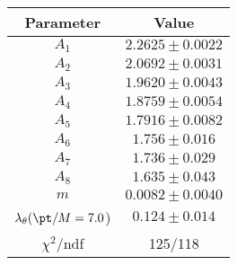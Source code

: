 \begin{tabular}{c|c}
Parameter & Value\\
\hline
$A_1$ & $2.2625\pm0.0022$ \\
$A_2$ & $2.0692\pm0.0031$ \\
$A_3$ & $1.9620\pm0.0043$ \\
$A_4$ & $1.8759\pm0.0054$ \\
$A_5$ & $1.7916\pm0.0082$ \\
$A_6$ & $1.756\pm0.016$ \\
$A_7$ & $1.736\pm0.029$ \\
$A_8$ & $1.635\pm0.043$ \\
$m$ & $0.0082\pm0.0040$ \\
$\lambda_\theta(\pt/M = 7.0$) & $0.124\pm0.014$ \\
\hline
$\chi^2$/ndf & 125/118
\end{tabular}
